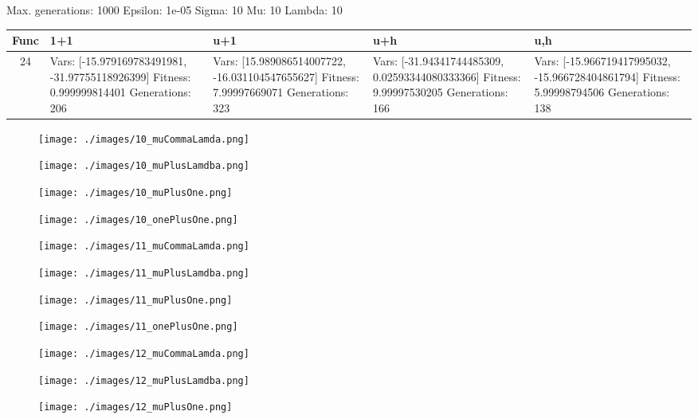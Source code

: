 \documentclass[landscape,11pt]{article}
\begin{document}
\newpage
Max. generations: 1000 Epsilon: 1e-05 Sigma: 10 Mu: 10 Lambda: 10 \\
\begin{tabular}{|c|p{5.4cm}|p{5.4cm}|p{5.4cm}|p{5.4cm}|}
\hline
Func & 1+1 & u+1 & u+h & u,h \\ 
\hline 24 & Vars: [-15.979169783491981, -31.97755118926399] Fitness: 0.999999814401 Generations: 206 & Vars: [15.989086514007722, -16.031104547655627] Fitness: 7.99997669071 Generations: 323 & Vars: [-31.94341744485309, 0.02593344080333366] Fitness: 9.99997530205 Generations: 166 & Vars: [-15.966719417995032, -15.966728404861794] Fitness: 5.99998794506 Generations: 138 \\
 \hline 
\end{tabular}
\begin{figure}
    \centering
    \texttt{[image: ./images/10\_muCommaLamda.png]}
\end{figure}\begin{figure}
    \centering
    \texttt{[image: ./images/10\_muPlusLamdba.png]}
\end{figure}\begin{figure}
    \centering
    \texttt{[image: ./images/10\_muPlusOne.png]}
\end{figure}\begin{figure}
    \centering
    \texttt{[image: ./images/10\_onePlusOne.png]}
\end{figure}\begin{figure}
    \centering
    \texttt{[image: ./images/11\_muCommaLamda.png]}
\end{figure}\begin{figure}
    \centering
    \texttt{[image: ./images/11\_muPlusLamdba.png]}
\end{figure}\begin{figure}
    \centering
    \texttt{[image: ./images/11\_muPlusOne.png]}
\end{figure}\begin{figure}
    \centering
    \texttt{[image: ./images/11\_onePlusOne.png]}
\end{figure}\begin{figure}
    \centering
    \texttt{[image: ./images/12\_muCommaLamda.png]}
\end{figure}\begin{figure}
    \centering
    \texttt{[image: ./images/12\_muPlusLamdba.png]}
\end{figure}\begin{figure}
    \centering
    \texttt{[image: ./images/12\_muPlusOne.png]}

\end{figure}
\end{document}

